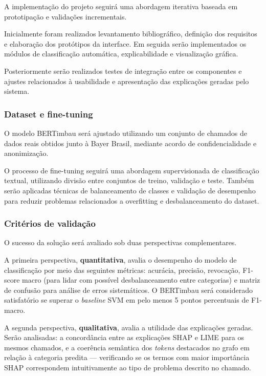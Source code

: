 \documentclass[
    12pt,                %
    openright,           %
    oneside,             %
    a4paper,             %
    english,             %
    brazil               %
]{abntex2}
\begin{document}
A implementação do projeto seguirá uma abordagem iterativa baseada em prototipação e validações incrementais.

Inicialmente foram realizados levantamento bibliográfico, definição dos requisitos e elaboração dos protótipos da interface. Em seguida serão implementados os módulos de classificação automática, explicabilidade e visualização gráfica.

Posteriormente serão realizados testes de integração entre os componentes e ajustes relacionados à usabilidade e apresentação das explicações geradas pelo sistema.

\subsubsection{Dataset e fine-tuning}

O modelo BERTimbau será ajustado utilizando um conjunto de chamados de dados reais obtidos junto à Bayer Brasil, mediante acordo de confidencialidade e anonimização.

O processo de fine-tuning seguirá uma abordagem supervisionada de classificação textual, utilizando divisão entre conjuntos de treino, validação e teste. Também serão aplicadas técnicas de balanceamento de classes e validação de desempenho para reduzir problemas relacionados a overfitting e desbalanceamento do dataset.

\subsubsection{Critérios de validação}

O sucesso da solução será avaliado sob duas perspectivas complementares.

A primeira perspectiva, \textbf{quantitativa}, avalia o desempenho do modelo de classificação por meio das seguintes métricas: acurácia, precisão, revocação, F1-score macro (para lidar com possível desbalanceamento entre categorias) e matriz de confusão para análise de erros sistemáticos. O BERTimbau será considerado satisfatório se superar o \textit{baseline} SVM em pelo menos 5 pontos percentuais de F1-macro.

A segunda perspectiva, \textbf{qualitativa}, avalia a utilidade das explicações geradas. Serão analisadas: a concordância entre as explicações SHAP e LIME para os mesmos chamados, e a coerência semântica dos \textit{tokens} destacados no grafo em relação à categoria predita — verificando se os termos com maior importância SHAP correspondem intuitivamente ao tipo de problema descrito no chamado.
\end{document}
